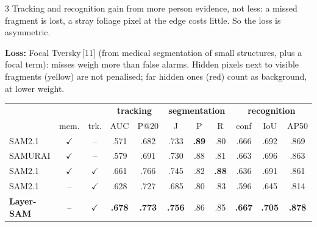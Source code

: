 \begin{multicols*}{3}
Tracking and recognition gain from more person evidence, not less: a missed fragment is lost, a stray foliage pixel
at the edge costs little. So the loss is asymmetric.


\textbf{Loss:} Focal Tversky\,[11] (from medical segmentation of small structures, plus a focal term): misses weigh
more than false alarms. Hidden pixels next to visible fragments (yellow) are not penalised; far hidden ones (red)
count as background, at lower weight.

\par\noindent\begin{minipage}{\linewidth}\raggedright   %

\begin{center}
\setlength{\tabcolsep}{3.3pt}\fontsize{19}{24}\selectfont
\begin{tabular}{@{}l cc cc ccc ccc@{}}
 & & & \multicolumn{2}{c}{\textbf{tracking}} & \multicolumn{3}{c}{\textbf{segmentation}} & \multicolumn{3}{c}{\textbf{recognition}} \\
 & mem. & trk. & AUC & P@20 & J & P & R & conf & IoU & AP50 \\\hline
SAM2.1 & $\checkmark$ & -- & .571 & .682 & .733 & \textbf{.89} & .80 & .666 & .692 & .869 \\
SAMURAI & $\checkmark$ & -- & .579 & .691 & .730 & .88 & .81 & .663 & .696 & .863 \\
SAM2.1 & $\checkmark$ & $\checkmark$ & .661 & .766 & .745 & .82 & \textbf{.88} & .636 & .691 & .861 \\
SAM2.1 & -- & $\checkmark$ & .628 & .727 & .685 & .80 & .83 & .596 & .645 & .814 \\
\textbf{Layer-SAM} & -- & $\checkmark$ & \textbf{.678} & \textbf{.773} & \textbf{.756} & .86 & .85 & \textbf{.667} & \textbf{.705} & \textbf{.878}
\end{tabular}
\end{center}


\end{minipage}
\end{multicols*}
